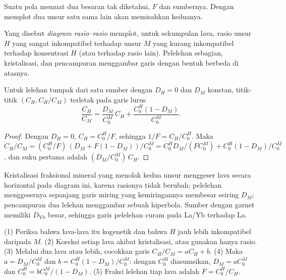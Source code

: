 Suatu pola memuat dua besaran tak diketahui, $F$ dan sumbernya. Dengan memplot dua unsur
satu sama lain akan memisahkan keduanya.

\begin{definition}\label{def:b3:trace-element-modelling:ratios}
Yang disebut \emph{diagram rasio--rasio} memplot, untuk sekumpulan
lava, rasio unsur $H$ yang sangat inkompatibel terhadap unsur $M$ yang kurang
inkompatibel terhadap konsentrasi $H$ (atau terhadap rasio lain). Pelelehan
sebagian, kristalisasi, dan pencampuran menggambar garis dengan bentuk berbeda
di atasnya.
\end{definition}

\begin{proposition}\label{prop:b3:trace-element-modelling:line}
Untuk lelehan tumpak dari satu sumber dengan $D_H = 0$ dan $D_M$ konstan, titik-titik
$(C_H, C_H/C_M)$ terletak pada garis lurus
\[
\frac{C_H}{C_M} = \frac{D_M}{C_0^M}\,C_H + \frac{C_0^H(1 - D_M)}{C_0^M}.
\]
\end{proposition}

\begin{proof}
Dengan $D_H = 0$, $C_H = C_0^H/F$, sehingga $1/F = C_H/C_0^H$. Maka
$C_H/C_M = (C_0^H/F)\,(D_M + F(1 - D_M))/C_0^M = C_0^HD_M/(FC_0^M) +
C_0^H(1 - D_M)/C_0^M$, dan suku pertama adalah $(D_M/C_0^M)\,C_H$.
\end{proof}

Kristalisasi fraksional mineral yang menolak kedua unsur menggeser lava
secara horizontal pada diagram ini, karena rasionya tidak berubah; pelelehan menggesernya
sepanjang garis miring yang kemiringannya membesar seiring $D_M$; pencampuran dua lelehan menggambar sebuah
hiperbola. Sumber dengan garnet memiliki $D_{\mathrm{Yb}}$ besar, sehingga garis
pelelehan curam pada La/Yb terhadap La.

\begin{method}\label{met:b3:trace-element-modelling:invert}
(1) Periksa bahwa lava-lava itu kogenetik dan bahwa $H$ jauh lebih inkompatibel
daripada $M$. (2) Koreksi setiap lava akibat kristalisasi, atau gunakan hanya rasio.
(3) Melalui dua lava atau lebih, cocokkan garis $C_H/C_M = aC_H + b$. (4) Maka
$a = D_M/C_0^M$ dan $b = C_0^H(1 - D_M)/C_0^M$: dengan $C_0^M$ diasumsikan, $D_M =
aC_0^M$ dan $C_0^H = bC_0^M/(1 - D_M)$. (5) Fraksi lelehan tiap lava adalah
$F = C_0^H/C_H$.
\end{method}

